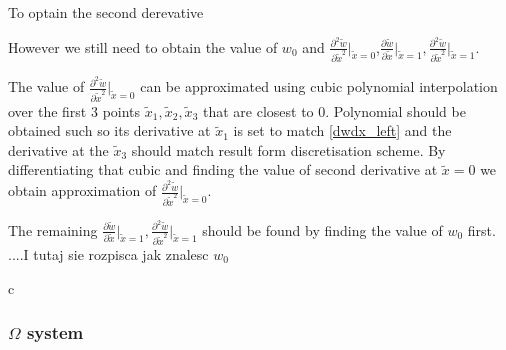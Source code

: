 To optain the second derevative

However we still need to obtain the value of $w_0$ and $\frac{\partial^2 \tilde w}{\partial \tilde x^2}|_{\tilde x=0}$,$\frac{\partial \tilde w}{\partial \tilde x}|_{\tilde x=1},$$\frac{\partial^2 \tilde w}{\partial \tilde x^2}|_{\tilde x=1}$.

The value of $\frac{\partial^2 \tilde w}{\partial \tilde x^2}|_{\tilde x=0}$ can be approximated using cubic polynomial interpolation over the first 3 points $\tilde x_1,\tilde x_2,\tilde x_3$ that are closest to 0. Polynomial should be obtained such so its derivative at $\tilde x_1$ is set to match \eqref{dwdx_left} and the derivative at the $\tilde x_3$ should match result form discretisation scheme. By differentiating that cubic and finding the value of second derivative at $\tilde x=0$ we obtain approximation of $\frac{\partial^2\tilde w}{\partial \tilde x^2}|_{\tilde x=0}$.

The remaining $\frac{\partial \tilde w}{\partial \tilde x}|_{\tilde x=1},$$\frac{\partial^2 \tilde w}{\partial \tilde x^2}|_{\tilde x=1}$ should be found by finding the value of $w_0$ first.
\dotfill
....I tutaj sie rozpisca jak znalesc $w_0$  \dotfill

c
\subsubsection{$\Omega$ system}


